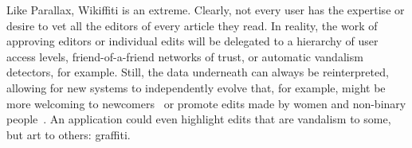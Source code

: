 Like Parallax, Wikiffiti is an extreme. Clearly, not every user
has the expertise or desire to vet all the editors of
every article they read. In reality, the work of approving editors
or individual edits will be delegated to
a hierarchy of user access levels,
friend-of-a-friend networks of trust,
or automatic vandalism detectors, for example.
Still, the data underneath can always be reinterpreted, allowing
for new systems to independently evolve that,
for example, might be more welcoming to newcomers~\cite{wikibourgeoisie, wikirisedecline}
or promote edits made by women and non-binary people~\cite{wikigender}.
An application could even highlight edits that are vandalism to some,
but art to others: graffiti.



